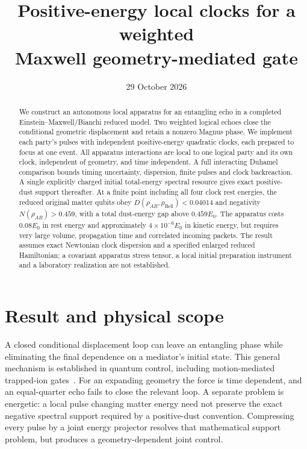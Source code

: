 \documentclass[11pt]{article}
\title{Positive-energy local clocks for a weighted\\Maxwell geometry-mediated gate}
\author{}
\date{29 October 2026}
\begin{document}
\maketitle

\begin{abstract}
We construct an autonomous local apparatus for an entangling echo in a completed Einstein--Maxwell/Bianchi reduced model.
Two weighted logical echoes close the conditional geometric displacement and retain a nonzero Magnus phase.
We implement each party's pulses with independent positive-energy quadratic clocks, each prepared to focus at one event.
All apparatus interactions are local to one logical party and its own clock, independent of geometry, and time independent.
A full interacting Duhamel comparison bounds timing uncertainty, dispersion, finite pulses and clock backreaction.
A single explicitly charged initial total-energy spectral resource gives exact positive-dust support thereafter.
At a finite point including all four clock rest energies, the reduced original matter qubits obey $D(\rho_{AB},\rho_{\mathrm{Bell}})<0.04014$ and negativity $N(\rho_{AB})>0.459$, with a total dust-energy gap above $0.459E_0$.
The apparatus costs $0.08E_0$ in rest energy and approximately $4\times10^{-6}E_0$ in kinetic energy, but requires very large volume, propagation time and correlated incoming packets.
The result assumes exact Newtonian clock dispersion and a specified enlarged reduced Hamiltonian; a covariant apparatus stress tensor, a local initial preparation instrument and a laboratory realization are not established.
\end{abstract}

\section{Result and physical scope}

A closed conditional displacement loop can leave an entangling phase while eliminating the final dependence on a mediator's initial state.
This general mechanism is established in quantum control, including motion-mediated trapped-ion gates~\cite{SorensenMolmer1999}.
For an expanding geometry the force is time dependent, and an equal-quarter echo fails to close the relevant loop.
A separate problem is energetic: a local pulse changing matter energy need not preserve the exact negative spectral support required by a positive-dust convention.
Compressing every pulse by a joint energy projector resolves that mathematical support problem, but produces a geometry-dependent joint control.
\end{document}
